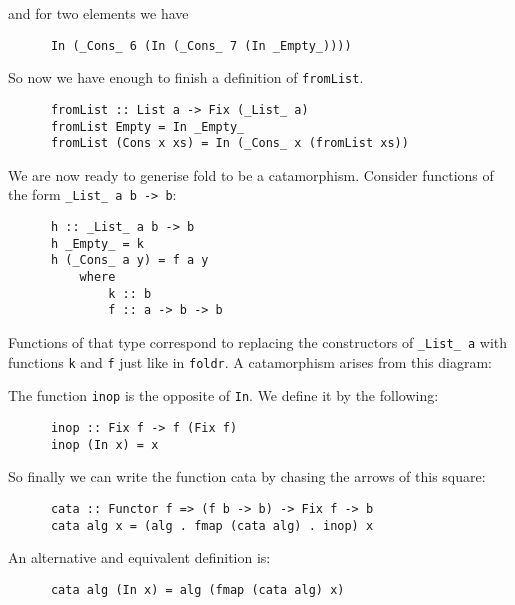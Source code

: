 \documentclass[a4paper,12pt]{article}
\theoremstyle{remark}
\begin{document}
  and for two elements we have

  \begin{lstlisting}
      In (_Cons_ 6 (In (_Cons_ 7 (In _Empty_))))  \end{lstlisting}

  So now we have enough to finish a definition of \lstinline{fromList}.

  \begin{lstlisting}
      fromList :: List a -> Fix (_List_ a)
      fromList Empty = In _Empty_
      fromList (Cons x xs) = In (_Cons_ x (fromList xs))  \end{lstlisting}

  We are now ready to generise fold to be a catamorphism. Consider functions of the form
  \lstinline{_List_ a b -> b}:

  \begin{lstlisting}
      h :: _List_ a b -> b
      h _Empty_ = k
      h (_Cons_ a y) = f a y
          where
              k :: b
              f :: a -> b -> b  \end{lstlisting}

  Functions of that type correspond to replacing the constructors of \lstinline{_List_ a} with functions \lstinline{k}
  and \lstinline{f} just like in \lstinline{foldr}. A catamorphism arises from this diagram:

  \begin{figure}[H]
    \centering
  \end{figure}

  The function \lstinline{inop} is the opposite of \lstinline{In}. We define it by the following:

  \begin{lstlisting}
      inop :: Fix f -> f (Fix f)
      inop (In x) = x  \end{lstlisting}

  So finally we can write the function cata by chasing the arrows of this square:

  \begin{lstlisting}
      cata :: Functor f => (f b -> b) -> Fix f -> b
      cata alg x = (alg . fmap (cata alg) . inop) x  \end{lstlisting}

  An alternative and equivalent definition is:

  \begin{lstlisting}
      cata alg (In x) = alg (fmap (cata alg) x)  \end{lstlisting}
\end{document}
